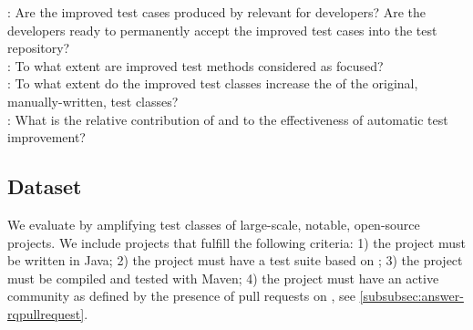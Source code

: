 \noindent\textbf{\rqpullrequest}: Are the improved test cases produced by \dspot relevant for developers? Are the developers ready to permanently accept the improved test cases into the test repository?\\
\textbf{\rqcandidates}: To what extent are improved test methods considered as focused?\\
\textbf{\rqeffectiveness}: To what extent do the improved test classes increase the \ms of the original,  manually-written, test classes?\\
\textbf{\rqAmplVersusIAmpl}: What is the relative contribution of \Iampl{} and \Aampl{} to the effectiveness of automatic test improvement?\\

\subsection{Dataset}
\label{subsec:dataset}

We evaluate \dspot by amplifying test classes of large-scale, notable, open-source projects. We include projects that fulfill the following criteria:  
1) the project must be written in Java; 
2) the project must have a test suite based on \junit;
3) the project must be compiled and tested with Maven;
4) the project must have an active community as defined by the presence of pull requests on \gh, see \autoref{subsubsec:answer-rqpullrequest}. 

